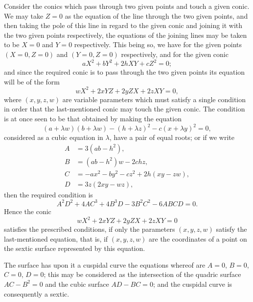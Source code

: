 \documentclass[12pt,a4paper]{article}
\begin{document}
Consider the conics which pass through two given points and touch a given conic. We may take $Z = 0$ as the equation of the line through the two given points, and then taking the pole of this line in regard to the given conic and joining it with the two given points respectively, the equations of the joining lines may be taken to be $X = 0$ and $Y = 0$ respectively. This being so, we have for the given points $(X = 0, Z = 0)$ and $(Y = 0, Z = 0)$ respectively, and for the given conic
\[
aX^2 + bY^2 + 2hXY + cZ^2 = 0;
\]
and since the required conic is to pass through the two given points its equation will be of the form
\[
wX^2 + 2xYZ + 2yZX + 2zXY = 0,
\]
where $(x, y, z, w)$ are variable parameters which must satisfy a single condition in order that the last-mentioned conic may touch the given conic. The condition is at once seen to be that obtained by making the equation
\[
(a + \lambda w)(b + \lambda w) - (h + \lambda z)^2 - c(x + \lambda y)^2 = 0,
\]
considered as a cubic equation in $\lambda$, have a pair of equal roots; or if we write
\begin{align*}
A &= 3(ab - h^2),\\
B &= (ab - h^2)w - 2chz,\\
C &= -ax^2 - by^2 - cz^2 + 2h(xy - zw),\\
D &= 3z(2xy - wz),
\end{align*}
then the required condition is
\[
A^2D^2 + 4AC^3 + 4B^3D - 3B^2C^2 - 6ABCD = 0.
\]
Hence the conic
\[
wX^2 + 2xYZ + 2yZX + 2zXY = 0
\]
satisfies the prescribed conditions, if only the parameters $(x, y, z, w)$ satisfy the last-mentioned equation, that is, if $(x, y, z, w)$ are the coordinates of a point on the sextic surface represented by this equation.

The surface has upon it a cuspidal curve the equations whereof are $A = 0$, $B = 0$, $C = 0$, $D = 0$; this may be considered as the intersection of the quadric surface $AC - B^2 = 0$ and the cubic surface $AD - BC = 0$; and the cuspidal curve is consequently a sextic.
\end{document}
